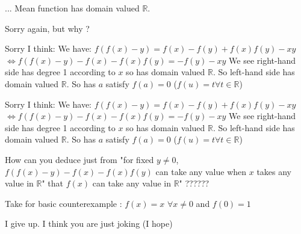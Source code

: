 


\begin{solution}
	\begin{tcolorbox} 
... Mean function has domain valued $\mathbb{R}$. \end{tcolorbox}
Sorry again, but why ?
\end{solution}



\begin{solution}
	Sorry I think:
We have:
$f(f(x)-y)=f(x)-f(y)+f(x)f(y)-xy$
$\Leftrightarrow f(f(x)-y)-f(x)-f(x)f(y)=-f(y)-xy$ 
We see right-hand side has degree 1 according to $x$ so has domain valued $\mathbb{R}$. So left-hand side has domain valued $\mathbb{R}$. So has $a$ satisfy $f(a)=0$
($f(u)=t \forall t\in \mathbb{R}$)
\end{solution}



\begin{solution}
	\begin{tcolorbox}Sorry I think:
We have:
$f(f(x)-y)=f(x)-f(y)+f(x)f(y)-xy$
$\Leftrightarrow f(f(x)-y)-f(x)-f(x)f(y)=-f(y)-xy$ 
We see right-hand side has degree 1 according to $x$ so has domain valued $\mathbb{R}$. So left-hand side has domain valued $\mathbb{R}$. So has $a$ satisfy $f(a)=0$
($f(u)=t \forall t\in \mathbb{R}$)\end{tcolorbox}

How can you deduce just from "for fixed $y\ne 0$, $f(f(x)-y)-f(x)-f(x)f(y)$ can take any value when $x$ takes any value in $\mathbb R$" that $f(x)$ can take any value in $\mathbb R$" ??????


Take for basic counterexample : $f(x)=x$ $\forall x\ne 0$ and $f(0)=1$


I give up. I think you are just joking (I hope)
\end{solution}



